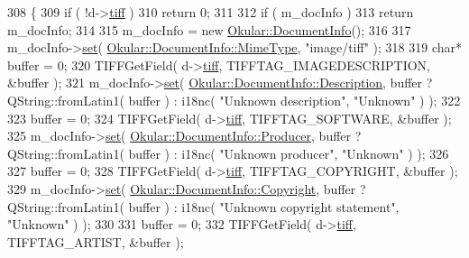 \begin{DoxyCode}
308 \{
309     \textcolor{keywordflow}{if} ( !d->\hyperlink{classTIFFGenerator_1_1Private_abe0f02dd2a2177e43a18938d465ef328}{tiff} )
310         \textcolor{keywordflow}{return} 0;
311 
312     \textcolor{keywordflow}{if} ( m\_docInfo )
313         \textcolor{keywordflow}{return} m\_docInfo;
314 
315     m\_docInfo = \textcolor{keyword}{new} \hyperlink{classOkular_1_1DocumentInfo}{Okular::DocumentInfo}();
316 
317     m\_docInfo->\hyperlink{classOkular_1_1DocumentInfo_a8bd5403394ab192f1103cbf2a8e48d9b}{set}( \hyperlink{classOkular_1_1DocumentInfo_a3a6e5f7fb246e29bcb2e830b6f770791a786464e8e8c3e6ba1cd74e408487785b}{Okular::DocumentInfo::MimeType}, \textcolor{stringliteral}{"image/tiff"} );
318 
319     \textcolor{keywordtype}{char}* buffer = 0;
320     TIFFGetField( d->\hyperlink{classTIFFGenerator_1_1Private_abe0f02dd2a2177e43a18938d465ef328}{tiff}, TIFFTAG\_IMAGEDESCRIPTION, &buffer );
321     m\_docInfo->\hyperlink{classOkular_1_1DocumentInfo_a8bd5403394ab192f1103cbf2a8e48d9b}{set}( \hyperlink{classOkular_1_1DocumentInfo_a3a6e5f7fb246e29bcb2e830b6f770791acc3edf1d2abe6eecb0882f4389475591}{Okular::DocumentInfo::Description}, buffer ? 
      QString::fromLatin1( buffer ) : i18nc( \textcolor{stringliteral}{"Unknown description"}, \textcolor{stringliteral}{"Unknown"} ) );
322 
323     buffer = 0;
324     TIFFGetField( d->\hyperlink{classTIFFGenerator_1_1Private_abe0f02dd2a2177e43a18938d465ef328}{tiff}, TIFFTAG\_SOFTWARE, &buffer );
325     m\_docInfo->\hyperlink{classOkular_1_1DocumentInfo_a8bd5403394ab192f1103cbf2a8e48d9b}{set}( \hyperlink{classOkular_1_1DocumentInfo_a3a6e5f7fb246e29bcb2e830b6f770791a4781bb7ac85d4fe7bdc448097aa1c48c}{Okular::DocumentInfo::Producer}, buffer ? 
      QString::fromLatin1( buffer ) : i18nc( \textcolor{stringliteral}{"Unknown producer"}, \textcolor{stringliteral}{"Unknown"} ) );
326 
327     buffer = 0;
328     TIFFGetField( d->\hyperlink{classTIFFGenerator_1_1Private_abe0f02dd2a2177e43a18938d465ef328}{tiff}, TIFFTAG\_COPYRIGHT, &buffer );
329     m\_docInfo->\hyperlink{classOkular_1_1DocumentInfo_a8bd5403394ab192f1103cbf2a8e48d9b}{set}( \hyperlink{classOkular_1_1DocumentInfo_a3a6e5f7fb246e29bcb2e830b6f770791a54b1ae59c56cd90e64b518e4d729471a}{Okular::DocumentInfo::Copyright}, buffer ? 
      QString::fromLatin1( buffer ) : i18nc( \textcolor{stringliteral}{"Unknown copyright statement"}, \textcolor{stringliteral}{"Unknown"} ) );
330 
331     buffer = 0;
332     TIFFGetField( d->\hyperlink{classTIFFGenerator_1_1Private_abe0f02dd2a2177e43a18938d465ef328}{tiff}, TIFFTAG\_ARTIST, &buffer );

\end{DoxyCode}
